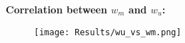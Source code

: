 \textbf{Correlation between $w_m$ and $w_u$:}
\begin{figure}[h]
    \centering
    \texttt{[image: Results/wu\_vs\_wm.png]}
\end{figure}